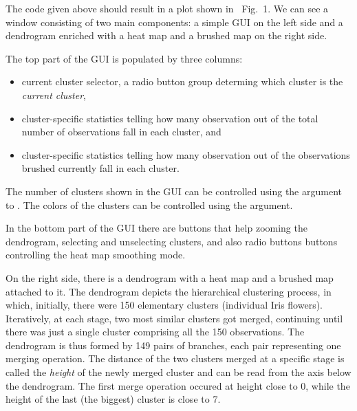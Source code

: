 \documentclass[article]{jss}
\newcommand{\myemph}[1]{\emph{#1}}
\newcommand{\Rfunction}[1]{\code{#1}}
\newcommand{\Rfunarg}[1]{\code{#1}}
\begin{document}
The code given above should result in a plot shown in~ Fig.~1.
We can see a window consisting of two main components: a
simple GUI on the left side and a dendrogram enriched with a heat map and a
brushed map on the right side. 

The top part of the GUI is populated by three
columns: 
\begin{itemize}
\item{current cluster selector, a radio button group determing
which cluster is the \myemph{current cluster},}
\item{cluster-specific statistics telling 
how many observation out of the total number of observations fall in
each cluster, and}
\item{cluster-specific statistics telling how many
observation out of the observations brushed currently fall in each
cluster.}
\end{itemize}

The number of clusters shown in the GUI can be controlled
using the \Rfunarg{maxClusterCount} argument to
\Rfunction{idendro}. 
The colors of the clusters can be controlled using the
\Rfunarg{clusterColors} argument. 

In the bottom part of the GUI there are buttons that help zooming the
dendrogram, selecting and unselecting clusters, and also radio buttons
buttons controlling the heat map smoothing mode. 

On the right side, there is a dendrogram with a heat map and a
brushed map attached to it. 
The dendrogram depicts the hierarchical clustering process, in which,
initially, there were 150 elementary clusters (individual Iris
flowers). Iteratively, at each stage, two most similar clusters got
merged, continuing until there was just a single cluster comprising all
the 150 observations. 
The dendrogram is thus formed by 149 pairs of branches, each pair
representing one merging operation. 
The distance of the two clusters merged at a specific stage is called the
\myemph{height} of the newly merged cluster and can be read from the axis
below the dendrogram.  The first merge operation occured at height
close to 0, while the height of the last (the biggest) cluster is close
to 7.  
\end{document}
